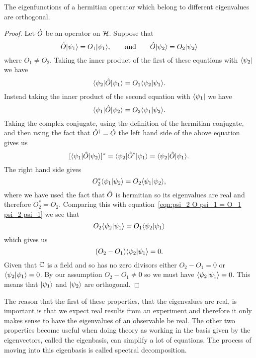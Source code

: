     \begin{theorem}
        The eigenfunctions of a hermitian operator which belong to different eigenvalues are orthogonal.
    \end{theorem}
    \begin{proof}
        Let \(\hat{O}\) be an operator on \(\mathcal{H}\).
        Suppose that
        \[\hat{O}\vert {\psi_1} \rangle = O_1\vert {\psi_1} \rangle, \qquad\text{and}\qquad \hat{O}\vert {\psi_2} \rangle = O_2\vert {\psi_2} \rangle\]
        where \(O_1 \ne O_2\).
        Taking the inner product of the first of these equations with \(\langle {\psi_2} \vert\) we have
        \begin{equation}\label{eqn:psi_2 O psi_1 = O_1 psi_2 psi_1}
            \langle {\psi_2} \vert\hat{O}\vert {\psi_1} \rangle = O_1\langle {\psi_2} \vert {\psi_1} \rangle.
        \end{equation}
        Instead taking the inner product of the second equation with \(\langle {\psi_1} \vert\) we have
        \[\langle {\psi_1} \vert\hat{O}\vert {\psi_2} \rangle = O_2\langle {\psi_1} \vert {\psi_2} \rangle.\]
        Taking the complex conjugate, using the definition of the hermitian conjugate, and then using the fact that \(\hat{O}^\dagger = \hat{O}\) the left hand side of the above equation gives us
        \[[\langle {\psi_1} \vert\hat{O}\vert {\psi_2} \rangle]^* = \langle {\psi_2} \vert\hat{O}^\dagger\vert {\psi_1} \rangle = \langle {\psi_2} \vert\hat{O}\vert {\psi_1} \rangle.\]
        The right hand side gives
        \[O_2^*\langle {\psi_1} \vert {\psi_2} \rangle = O_2\langle {\psi_1} \vert {\psi_2} \rangle,\]
        where we have used the fact that \(\hat{O}\) is hermitian so its eigenvalues are real and therefore \(O_2^* = O_2\).
        Comparing this with equation~\ref{eqn:psi_2 O psi_1 = O_1 psi_2 psi_1} we see that
        \[O_2\langle {\psi_2} \vert {\psi_1} \rangle = O_1\langle {\psi_2} \vert {\psi_1} \rangle\]
        which gives us
        \[(O_2 - O_1)\langle {\psi_2} \vert {\psi_1} \rangle = 0.\]
        Given that \(\mathbb{C}\) is a field and so has no zero divisors either \(O_2 - O_1 = 0\) or \(\langle {\psi_2} \vert {\psi_1} \rangle = 0\).
        By our assumption \(O_2 - O_1\ne 0\) so we must have \(\langle {\psi_2} \vert {\psi_1} \rangle = 0\).
        This means that \(\vert {\psi_1} \rangle\) and \(\vert {\psi_2} \rangle\) are orthogonal.
    \end{proof}
    
    The reason that the first of these properties, that the eigenvalues are real, is important is that we expect real results from an experiment and therefore it only makes sense to have the eigenvalues of an observable be real.
    The other two properties become useful when doing theory as working in the basis given by the eigenvectors, called the eigenbasis, can simplify a lot of equations.
    The process of moving into this eigenbasis is called spectral decomposition.
    
